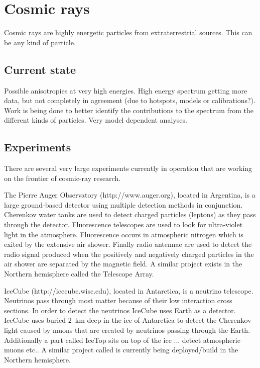 \chapter{Cosmic rays}
\label{ch:cosmic-rays}

Cosmic rays are highly energetic particles from extraterrestrial sources.
This can be any kind of particle.


\section{Current state}

Possible anisotropies at very high energies. High energy spectrum
getting more data, but not completely in agreement (due to hotspots,
models or calibrations?). Work is being done to better identify the
contributions to the spectrum from the different kinds of particles.
Very model dependent analyses.


\section{Experiments}

There are several very large experiments currently in operation that are
working on the frontier of cosmic-ray research.

The Pierre Auger Observatory (http://www.auger.org), located in
Argentina, is a large ground-based detector using multiple detection
methods in conjunction. Cherenkov water tanks are used to detect charged
particles (leptons) as they pass through the detector. Fluorescence
telescopes are used to look for ultra-violet light in the atmosphere.
Fluorescence occurs in atmospheric nitrogen which is exited by the
extensive air shower. Finally radio antennae are used to detect the
radio signal produced when the positively and negatively charged
particles in the air shower are separated by the magnetic field. A
similar project exists in the Northern hemisphere called the Telescope
Array.

IceCube (http://icecube.wisc.edu), located in Antarctica, is a neutrino
telescope. Neutrinos pass through most matter because of their low
interaction cross sections. In order to detect the neutrinos IceCube
uses Earth as a detector. IceCube uses \pmts buried \SI{2}{\kilo\meter}
deep in the ice of Antarctica to detect the Cherenkov light caused by
muons that are created by neutrinos passing through the Earth.
Additionally a part called IceTop sits on top of the ice ... detect
atmospheric muons etc.. A similar project called \kmnet is currently
being deployed/build in the Northern hemisphere.

